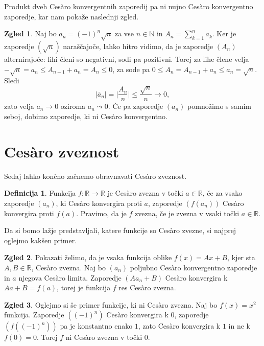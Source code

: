 \documentclass[a4paper,12pt]{article}
\def\N{\mathbb{N}}
\theoremstyle{definition}
\newtheorem{definicija}{Definicija}
\newtheorem{zgled}{Zgled}
\theoremstyle{plain}
\begin{document}
Produkt dveh Ces\`{a}ro konvergentnih zaporedij pa ni nujno Ces\`{a}ro konvergentno zaporedje, kar nam pokaže naslednji zgled.
\begin{zgled}
    Naj bo $a_n = (-1)^n \sqrt{n}$ za vse $n \in \N$ in $A_n = \sum_{k=1}^{n}a_k$. Ker je zaporedje $(\sqrt{n})$ naraščajoče, lahko hitro vidimo, da je zaporedje $(A_n)$ alternirajoče: lihi členi so negativni, sodi pa pozitivni. Torej za lihe člene velja $-\sqrt{n} = a_n \leq A_{n-1} + a_n = A_n \leq 0$, za sode pa $0 \leq A_n = A_{n-1} + a_n \leq a_n = \sqrt{n}$. Sledi 
    $$\lvert \overline{a}_n \rvert = \lvert \frac{A_n}{n} \rvert \leq \frac{\sqrt{n}}{n} \rightarrow 0,$$
    zato velja $a_n \rightarrow 0$ oziroma $a_n \leadsto 0$. Če pa zaporedje $(a_n)$ pomnožimo s samim seboj, dobimo zaporedje, ki ni Ces\`{a}ro konvergentno.
\end{zgled}




\section{Ces\`{a}ro zveznost}
Sedaj lahko končno začnemo obravnavati Ces\`{a}ro zveznost.

\begin{definicija}
    Funkcija $f: \mathbb{R} \rightarrow \mathbb{R}$ je Ces\`{a}ro zvezna v točki $a \in \mathbb{R}$, če za vsako zaporedje $(a_n)$, ki Ces\`{a}ro konvergira proti $a$, zaporedje $(f(a_n))$ Ces\`{a}ro konvergira proti $f(a)$. Pravimo, da je $f$ zvezna, če je zvezna v vsaki točki $a \in \mathbb{R}$.
\end{definicija}

Da si bomo lažje predstavljali, katere funkcije so Ces\`{a}ro zvezne, si najprej oglejmo kakšen primer.

\begin{zgled}
    Pokazati želimo, da je vsaka funkcija oblike $f(x) = Ax + B$, kjer sta $A, B \in \mathbb{R}$, Ces\`{a}ro zvezna. Naj bo $(a_n)$ poljubno Ces\`{a}ro konvergentno zaporedje in $a$ njegova Ces\`{a}ro limita. Zaporedje $(A a_n + B)$ Ces\`{a}ro konvergira k $A a + B = f(a)$, torej je funkcija $f$ res Ces\`{a}ro zvezna.
\end{zgled}

\begin{zgled}
    Oglejmo si še primer funkcije, ki ni Ces\`{a}ro zvezna. Naj bo $f(x) = x^2$ funkcija. Zaporedje $((-1)^n)$ Ces\`{a}ro konvergira k $0$, zaporedje $(f((-1)^n))$ pa je konstantno enako $1$, zato Ces\`{a}ro konvergira k $1$ in ne k $f(0) = 0$. Torej $f$ ni Ces\`{a}ro zvezna v točki $0$.
\end{zgled}
\end{document}
